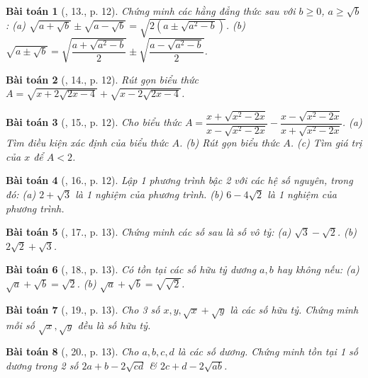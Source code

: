 \documentclass{article}
\newtheorem{baitoan}{Bài toán}
\begin{document}
\begin{baitoan}[\cite{Binh_Toan_9_tap_1}, 13., p. 12]
	Chứng minh các hằng đẳng thức sau với $b\ge0$, $a\ge\sqrt{b}$: (a) $\sqrt{a + \sqrt{b}}\pm\sqrt{a - \sqrt{b}} = \sqrt{2(a\pm\sqrt{a^2 - b})}$. (b) $\sqrt{a\pm\sqrt{b}} = \sqrt{\dfrac{a + \sqrt{a^2 - b}}{2}}\pm\sqrt{\dfrac{a - \sqrt{a^2 - b}}{2}}$.
\end{baitoan}

\begin{baitoan}[\cite{Binh_Toan_9_tap_1}, 14., p. 12]
	Rút gọn biểu thức $A = \sqrt{x + 2\sqrt{2x - 4}} + \sqrt{x - 2\sqrt{2x - 4}}$.
\end{baitoan}

\begin{baitoan}[\cite{Binh_Toan_9_tap_1}, 15., p. 12]
	Cho biểu thức $A = \dfrac{x + \sqrt{x^2 - 2x}}{x - \sqrt{x^2 - 2x}} - \dfrac{x - \sqrt{x^2 - 2x}}{x + \sqrt{x^2 - 2x}}$. (a) Tìm điều kiện xác định của biểu thức $A$. (b) Rút gọn biểu thức $A$. (c) Tìm giá trị của $x$ để $A < 2$.
\end{baitoan}

\begin{baitoan}[\cite{Binh_Toan_9_tap_1}, 16., p. 12]
	Lập 1 phương trình bậc 2 với các hệ số nguyên, trong đó: (a) $2 + \sqrt{3}$ là 1 nghiệm của phương trình. (b) $6 - 4\sqrt{2}$ là 1 nghiệm của phương trình.
\end{baitoan}

\begin{baitoan}[\cite{Binh_Toan_9_tap_1}, 17., p. 13]
	Chứng minh các số sau là số vô tỷ: (a) $\sqrt{3} - \sqrt{2}$. (b) $2\sqrt{2} + \sqrt{3}$.
\end{baitoan}

\begin{baitoan}[\cite{Binh_Toan_9_tap_1}, 18., p. 13]
	Có tồn tại các số hữu tỷ dương $a,b$ hay không nếu: (a) $\sqrt{a} + \sqrt{b} = \sqrt{2}$. (b) $\sqrt{a} + \sqrt{b} = \sqrt{\sqrt{2}}$.
\end{baitoan}

\begin{baitoan}[\cite{Binh_Toan_9_tap_1}, 19., p. 13]
	Cho 3 số $x,y,\sqrt{x} + \sqrt{y}$ là các số hữu tỷ. Chứng minh mỗi số $\sqrt{x},\sqrt{y}$ đều là số hữu tỷ.
\end{baitoan}

\begin{baitoan}[\cite{Binh_Toan_9_tap_1}, 20., p. 13]
	Cho $a,b,c,d$ là các số dương. Chứng minh tồn tại 1 số dương trong 2 số $2a + b - 2\sqrt{cd}$ \& $2c + d - 2\sqrt{ab}$.
\end{baitoan}
\end{document}
